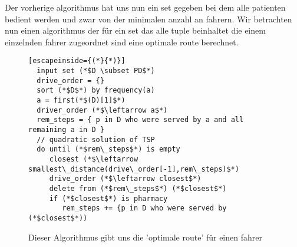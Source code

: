 \documentclass[a4]{article}
\begin{document}
Der vorherige algorithmus hat uns nun ein set gegeben bei dem alle patienten bedient werden und zwar von der minimalen anzahl an fahrern. Wir betrachten nun einen algorithmus der für ein set das alle tuple beinhaltet die einem einzelnden fahrer zugeordnet sind eine optimale route berechnet.

\begin{figure}[h]
\begin{lstlisting}[escapeinside={(*}{*)}]
  input set (*$D \subset PD$*)
  drive_order = {}
  sort (*$D$*) by frequency(a)
  a = first(*$(D)[1]$*)
  driver_order (*$\leftarrow a$*)
  rem_steps = { p in D who were served by a and all remaining a in D }
  // quadratic solution of TSP
  do until (*$rem\_steps$*) is empty
     closest (*$\leftarrow smallest\_distance(drive\_order[-1],rem\_steps)$*)
     drive_order (*$\leftarrow closest$*)
     delete from (*$rem\_steps$*) (*$closest$*)
     if (*$closest$*) is pharmacy
        rem_steps += {p in D who were served by (*$closest$*))
\end{lstlisting}
\caption{Dieser Algorithmus gibt uns die 'optimale route' für einen fahrer}
\end{figure}
\end{document}
